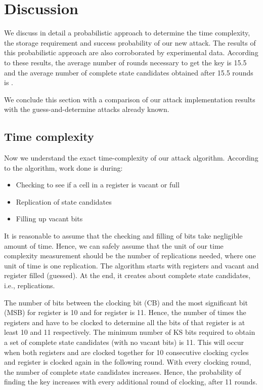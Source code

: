 \documentclass{llncs}
\begin{document}
\section{Discussion}
We discuss in detail a probabilistic approach to determine the time complexity, the storage requirement and success probability of our new attack. The results of this probabilistic approach are also corroborated by experimental data.
According to these results, the average number of rounds necessary to get the key is 15.5 and the average number of complete state candidates obtained after 15.5 rounds is .

We conclude this section with a comparison of our attack implementation results with the guess-and-determine attacks already known.

\subsection{Time complexity} 
Now we understand the exact time-complexity of our attack algorithm. According to the algorithm, work done is during:
\begin{itemize}
\item {Checking to see if a cell in a register is vacant or full}
\item {Replication of state candidates}
\item{Filling up vacant bits}
\end{itemize}
It is reasonable to assume that the checking and filling of bits take negligible amount of time. Hence, we can safely assume that the unit of our time complexity measurement should be the number of replications needed, where one unit of time is one replication. The algorithm starts with registers  and  vacant and register  filled (guessed). At the end, it creates about  complete state candidates, i.e.,  replications. 

The number of bits between the clocking bit (CB) and the most significant bit (MSB) for register  is 10 and for register  is 11. Hence, the number of times the registers  and  have to be clocked to determine all the bits of that register is at least 10 and 11 respectively. The minimum number of KS bits required to obtain a set of complete state candidates (with no vacant bits) is 11. This will occur when both registers  and  are clocked together for 10 consecutive clocking cycles and register  is clocked again in the following round. With every clocking round, the number of complete state candidates increases. Hence, the probability of finding the key increases with every additional round of clocking, after 11 rounds.
\end{document}
